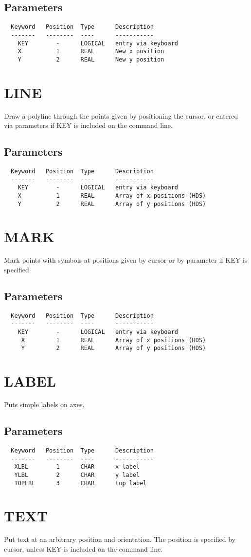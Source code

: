 \documentclass{book}
\renewcommand{\_}{{\tt\char'137}}     %
\begin{document}
\subsection{Parameters}
\begin{verbatim}
  Keyword   Position  Type      Description
  -------   --------  ----      -----------
    KEY        -      LOGICAL   entry via keyboard
    X          1      REAL      New x position
    Y          2      REAL      New y position

\end{verbatim}\section{LINE}
Draw a polyline through the points given by positioning
the cursor, or entered via parameters if KEY is included
on the command line.

\subsection{Parameters}
\begin{verbatim}
  Keyword   Position  Type      Description
  -------   --------  ----      -----------
    KEY        -      LOGICAL   entry via keyboard
    X          1      REAL      Array of x positions (HDS)
    Y          2      REAL      Array of y positions (HDS)
\end{verbatim}\section{MARK}
Mark points with symbols at positions given by cursor
or by parameter if KEY is specified.

\subsection{Parameters}
\begin{verbatim}
  Keyword   Position  Type      Description
  -------   --------  ----      -----------
    KEY        -      LOGICAL   entry via keyboard
     X         1      REAL      Array of x positions (HDS)
     Y         2      REAL      Array of y positions (HDS)
\end{verbatim}\section{LABEL}
Puts simple labels on axes.
\subsection{Parameters}
\begin{verbatim}
  Keyword   Position  Type      Description
  -------   --------  ----      -----------
   XLBL        1      CHAR      x label
   YLBL        2      CHAR      y label
   TOPLBL      3      CHAR      top label
\end{verbatim}\section{TEXT}
Put text at an arbitrary position and orientation. The position
is specified by cursor, unless KEY is included on the command line.
\end{document}
